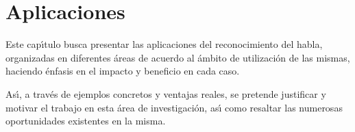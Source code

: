 \chapter{Aplicaciones}
\label{sec:aplicaciones}

Este cap{\'\i}tulo busca presentar las aplicaciones del reconocimiento del habla, organizadas en diferentes
\'areas de acuerdo al \'ambito de utilizaci\'on de las mismas, haciendo \'enfasis en el impacto y beneficio
en cada caso.

As{\'\i}, a trav\'es de ejemplos concretos y ventajas reales, se pretende justificar y motivar el trabajo
en esta \'area de investigaci\'on, as{\'\i} como resaltar las numerosas oportunidades existentes en la misma.








